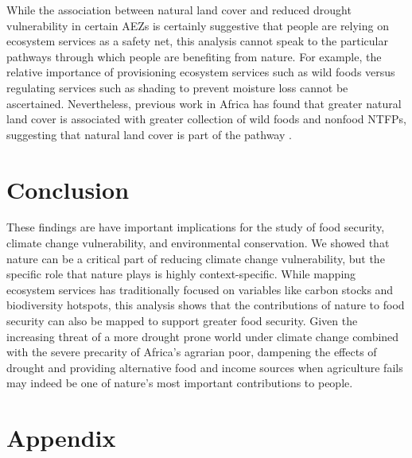 \documentclass{article}
\begin{document}
While the association between natural land cover and reduced drought vulnerability in certain AEZs is certainly suggestive that people are relying on ecosystem services as a safety net, this analysis cannot speak to the particular pathways through which people are benefiting from nature.  For example, the relative importance of provisioning ecosystem services such as wild foods versus regulating services such as shading to prevent moisture loss cannot be ascertained.  Nevertheless, previous work in Africa has found that greater natural land cover is associated with greater collection of wild foods and nonfood NTFPs, suggesting that natural land cover is part of the pathway \cite{Cooper2018a}.

\section{Conclusion}
These findings are have important implications for the study of food security, climate change vulnerability, and environmental conservation.  We showed that nature can be a critical part of reducing climate change vulnerability, but the specific role that nature plays is highly context-specific.  While mapping ecosystem services has traditionally focused on variables like carbon stocks and biodiversity hotspots, this analysis shows that the contributions of nature to food security can also be mapped to support greater food security.  Given the increasing threat of a more drought prone world under climate change \cite{Dai2013} combined with the severe precarity of Africa's agrarian poor, dampening the effects of drought and providing alternative food and income sources when agriculture fails may indeed be one of nature's most important contributions to people.





\setcounter{section}{0}
\renewcommand{\thetable}{A\arabic{section}}
\section*{Appendix} \label{AppendixA}
\setcounter{table}{0}
\setcounter{figure}{0}
\renewcommand{\thetable}{A\arabic{table}}
\renewcommand{\thefigure}{A\arabic{figure}}



\end{document}
